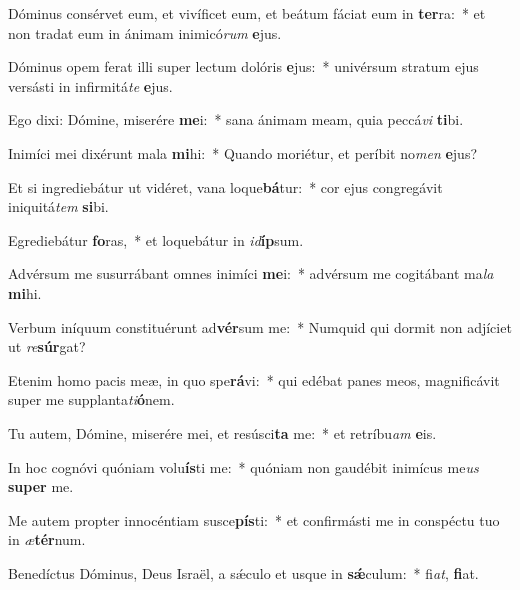 \item Dóminus consérvet eum, et vivíficet eum, et beátum fáciat eum in \textbf{ter}ra:~* et non tradat eum in ánimam inimicó\textit{rum} \textbf{e}jus.
\item Dóminus opem ferat illi super lectum dolóris \textbf{e}jus:~* univérsum stratum ejus versásti in infirmitá\textit{te} \textbf{e}jus.
\item Ego dixi: Dómine, miserére \textbf{me}i:~* sana ánimam meam, quia peccá\textit{vi} \textbf{ti}bi.
\item Inimíci mei dixérunt mala \textbf{mi}hi:~* Quando moriétur, et períbit no\textit{men} \textbf{e}jus?
\item Et si ingrediebátur ut vidéret, vana loque\textbf{bá}tur:~* cor ejus congregávit iniquitá\textit{tem} \textbf{si}bi.
\item Egrediebátur \textbf{fo}ras,~* et loquebátur in \textit{id}\textbf{íp}sum.
\item Advérsum me susurrábant omnes inimíci \textbf{me}i:~* advérsum me cogitábant ma\textit{la} \textbf{mi}hi.
\item Verbum iníquum constituérunt ad\textbf{vér}sum me:~* Numquid qui dormit non adjíciet ut \textit{re}\textbf{súr}gat?
\item Etenim homo pacis meæ, in quo spe\textbf{rá}vi:~* qui edébat panes meos, magnificávit super me supplanta\textit{ti}\textbf{ó}nem.
\item Tu autem, Dómine, miserére mei, et resúsci\textbf{ta} me:~* et retríbu\textit{am} \textbf{e}is.
\item In hoc cognóvi quóniam volu\textbf{ís}ti me:~* quóniam non gaudébit inimícus me\textit{us} \textbf{su}\textbf{per} me.
\item Me autem propter innocéntiam susce\textbf{pís}ti:~* et confirmásti me in conspéctu tuo in \textit{æ}\textbf{tér}num.
\item Benedíctus Dóminus, Deus Israël, a sǽculo et usque in \textbf{sǽ}culum:~* fi\textit{at}, \textbf{fi}at.
